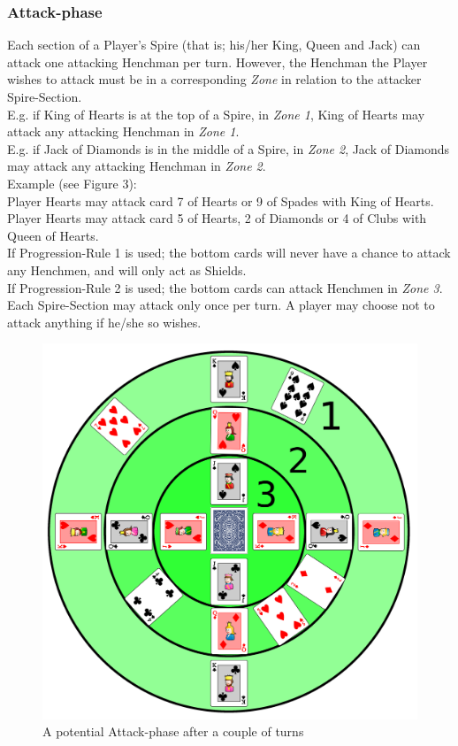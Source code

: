 \documentclass[11pt,twocolumn]{article}
\begin{document}
\subsubsection{Attack-phase}
Each section of a Player's Spire (that is; his/her King, Queen and Jack) can attack one attacking Henchman per turn. However, the Henchman the Player wishes to attack must be in a corresponding \textit{Zone} in relation to the attacker Spire-Section. \\
E.g. if King of Hearts is at the top of a Spire, in \textit{Zone 1}, King of Hearts may attack any attacking Henchman in \textit{Zone 1}. \\
E.g. if Jack of Diamonds is in the middle of a Spire, in \textit{Zone 2}, Jack of Diamonds may attack any attacking Henchman in \textit{Zone 2}.\\

\noindent
Example (see Figure 3): \\
Player Hearts may attack card 7 of Hearts or 9 of Spades with King of Hearts. \\
Player Hearts may attack card 5 of Hearts, 2 of Diamonds or 4 of Clubs with Queen of Hearts. \\
If Progression-Rule 1 is used; the bottom cards will never have a chance to attack any Henchmen, and will only act as Shields. \\
If Progression-Rule 2 is used; the bottom cards can attack Henchmen in \textit{Zone 3}. \\

\noindent
Each Spire-Section may attack only once per turn. A player may choose not to attack anything if he/she so wishes.

\begin{figure}[h!]
\centering
\includegraphics[scale=0.08]{attack.png}
\caption{A potential Attack-phase after a couple of turns}
\label{starting}
\end{figure}
\end{document}
